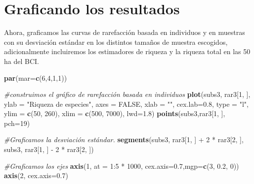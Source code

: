 \documentclass[]{book}
\newenvironment{Shaded}{\begin{snugshade}}{\end{snugshade}}
\newcommand{\KeywordTok}[1]{\textcolor[rgb]{0.13,0.29,0.53}{\textbf{{#1}}}}
\newcommand{\DataTypeTok}[1]{\textcolor[rgb]{0.13,0.29,0.53}{{#1}}}
\newcommand{\DecValTok}[1]{\textcolor[rgb]{0.00,0.00,0.81}{{#1}}}
\newcommand{\FloatTok}[1]{\textcolor[rgb]{0.00,0.00,0.81}{{#1}}}
\newcommand{\StringTok}[1]{\textcolor[rgb]{0.31,0.60,0.02}{{#1}}}
\newcommand{\CommentTok}[1]{\textcolor[rgb]{0.56,0.35,0.01}{\textit{{#1}}}}
\newcommand{\OtherTok}[1]{\textcolor[rgb]{0.56,0.35,0.01}{{#1}}}
\newcommand{\NormalTok}[1]{{#1}}
\begin{document}
\section{Graficando los resultados}\label{graficando-los-resultados}

Ahora, graficamos las curvas de rarefacción basada en individuos y en
muestras con su desviación estándar en los distintos tamaños de muestra
escogidos, adicionalmente incluiremos los estimadores de riqueza y la
riqueza total en las 50 ha del BCI.

\begin{Shaded}
\begin{Highlighting}[]
\KeywordTok{par}\NormalTok{(}\DataTypeTok{mar=}\KeywordTok{c}\NormalTok{(}\DecValTok{6}\NormalTok{,}\DecValTok{4}\NormalTok{,}\DecValTok{1}\NormalTok{,}\DecValTok{1}\NormalTok{))}

\CommentTok{#construimos el gráfico de rarefacción basada en individuos}
\KeywordTok{plot}\NormalTok{(subs3, rar3[}\DecValTok{1}\NormalTok{, ], }\DataTypeTok{ylab =} \StringTok{"Riqueza de especies"}\NormalTok{, }
          \DataTypeTok{axes =} \OtherTok{FALSE}\NormalTok{, }\DataTypeTok{xlab =} \StringTok{""}\NormalTok{, }\DataTypeTok{cex.lab=}\FloatTok{0.8}\NormalTok{, }
        \DataTypeTok{type =} \StringTok{"l"}\NormalTok{, }\DataTypeTok{ylim =} \KeywordTok{c}\NormalTok{(}\DecValTok{50}\NormalTok{, }\DecValTok{260}\NormalTok{), }\DataTypeTok{xlim =} \KeywordTok{c}\NormalTok{(}\DecValTok{500}\NormalTok{, }\DecValTok{7000}\NormalTok{), }\DataTypeTok{lwd=}\FloatTok{1.8}\NormalTok{)}
\KeywordTok{points}\NormalTok{(subs3,rar3[}\DecValTok{1}\NormalTok{, ], }\DataTypeTok{pch=}\DecValTok{19}\NormalTok{)}

\CommentTok{#Graficamos la desviación estándar.}
\KeywordTok{segments}\NormalTok{(subs3, rar3[}\DecValTok{1}\NormalTok{, ] +}\StringTok{ }\DecValTok{2} \NormalTok{*}\StringTok{ }\NormalTok{rar3[}\DecValTok{2}\NormalTok{, ], }
         \NormalTok{subs3, rar3[}\DecValTok{1}\NormalTok{, ] -}\StringTok{ }\DecValTok{2} \NormalTok{*}\StringTok{ }\NormalTok{rar3[}\DecValTok{2}\NormalTok{, ])}

\CommentTok{#Graficamos los ejes}
\KeywordTok{axis}\NormalTok{(}\DecValTok{1}\NormalTok{, }\DataTypeTok{at =} \DecValTok{1}\NormalTok{:}\DecValTok{5} \NormalTok{*}\StringTok{ }\DecValTok{1000}\NormalTok{, }\DataTypeTok{cex.axis=}\FloatTok{0.7}\NormalTok{,}\DataTypeTok{mgp=}\KeywordTok{c}\NormalTok{(}\DecValTok{3}\NormalTok{, }\FloatTok{0.2}\NormalTok{, }\DecValTok{0}\NormalTok{)) }
\KeywordTok{axis}\NormalTok{(}\DecValTok{2}\NormalTok{, }\DataTypeTok{cex.axis=}\FloatTok{0.7}\NormalTok{) }


\end{Highlighting}
\end{Shaded}
\end{document}
